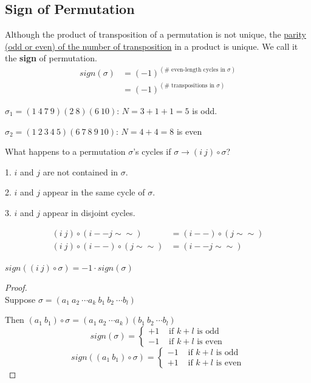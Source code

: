 \documentclass[11pt]{elegantbook}
\begin{document}
\subsection{Sign of Permutation}
\begin{theorem}
Although the product of transposition of a permutation is not unique, the \underline{parity (odd or even) of the number of transposition} in a product is unique. We call it the \textbf{sign} of permutation.
\begin{equation}
    \begin{aligned}
        sign(\sigma)&=(-1)^{(\#\text{ even-length cycles in }\sigma)}\\
        &=(-1)^{(\#\text{ transpositions in }\sigma)}
    \end{aligned}
    \nonumber
\end{equation}
\end{theorem}

\begin{example}
\quad

$\sigma_1=(1\ 4\ 7\ 9)(2\ 8)(6\ 10)$: $N=3+1+1=5$ is odd.

$\sigma_2=(1\ 2\ 3\ 4\ 5)(6\ 7\ 8\ 9\ 10)$: $N=4+4=8$ is even
\end{example}

What happens to a permutation $\sigma$'s cycles if $\sigma \rightarrow (i\ j)\circ\sigma$?

1. $i$ and $j$ are not contained in $\sigma$.

2. $i$ and $j$ appear in the same cycle of $\sigma$.

3. $i$ and $j$ appear in disjoint cycles.

\begin{equation}
    \begin{aligned}
        (i\ j)\circ (i-- j\sim\sim)&=(i--)\circ(j\sim\sim)\\
        (i\ j)\circ(i--)\circ(j\sim\sim)&=(i-- j\sim\sim)
    \end{aligned}
    \nonumber
\end{equation}
\begin{proposition}
    $sign((i\ j)\circ\sigma)=-1\cdot sign(\sigma)$
\end{proposition}
\begin{proof}
\quad\\

Suppose $\sigma=(a_1\ a_2\ \cdots a_k\ b_1\ b_2\ \cdots b_l)$

Then $(a_1\ b_1)\circ\sigma=(a_1\ a_2\ \cdots a_k)(b_1\ b_2\ \cdots b_l)$
$$sign(\sigma)=\left\{\begin{matrix}
    +1&\text{ if $k+l$ is odd}\\
    -1&\text{ if $k+l$ is even}
\end{matrix}\right.$$
$$sign((a_1\ b_1)\circ\sigma)=\left\{\begin{matrix}
    -1&\text{ if $k+l$ is odd}\\
    +1&\text{ if $k+l$ is even}
\end{matrix}\right.$$

\end{proof}
\end{document}
